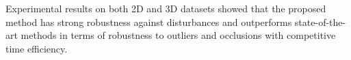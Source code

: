 \documentclass[11pt,bezier,]{article}
\begin{document}
Experimental results on both 2D and 3D datasets 
showed that the proposed method has strong robustness against disturbances
and outperforms state-of-the-art methods in terms of robustness to outliers and occlusions
with competitive time efficiency.




{\small

}
\end{document}
